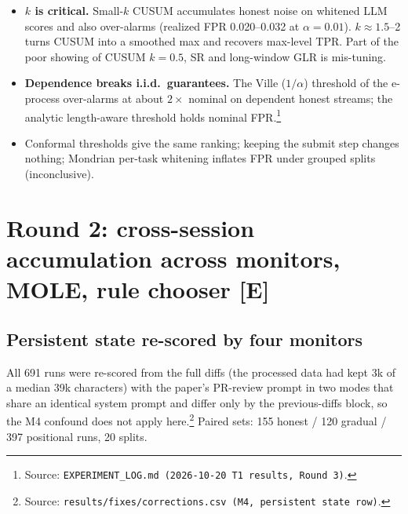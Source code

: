 \documentclass[11pt]{article}
\newcommand{\src}[1]{\footnote{Source: \nolinkurl{#1}.}}
\newcommand{\tE}{\textsf{\scriptsize\textcolor{ink2}{[E]}}\xspace}
\begin{document}
\begin{itemize}
\item \textbf{$k$ is critical.} Small-$k$ CUSUM accumulates honest noise on whitened LLM scores and also over-alarms (realized FPR 0.020--0.032 at $\alpha=0.01$). $k\approx1.5$--2 turns CUSUM into a smoothed max and recovers max-level TPR. Part of the poor showing of CUSUM $k{=}0.5$, SR and long-window GLR is mis-tuning.
\item \textbf{Dependence breaks i.i.d.\ guarantees.} The Ville ($1/\alpha$) threshold of the e-process over-alarms at about $2\times$ nominal on dependent honest streams; the analytic length-aware threshold holds nominal FPR.\src{EXPERIMENT_LOG.md (2026-10-20 T1 results, Round 3)}
\item Conformal thresholds give the same ranking; keeping the submit step changes nothing; Mondrian per-task whitening inflates FPR under grouped splits (inconclusive).
\end{itemize}

\section{Round 2: cross-session accumulation across monitors, MOLE, rule chooser \tE}

\subsection{Persistent state re-scored by four monitors}\label{sec:ps}
All 691 runs were re-scored from the full diffs (the processed data had kept 3k of a median 39k characters) with the paper's PR-review prompt in two modes that share an identical system prompt and differ only by the previous-diffs block, so the M4 confound does not apply here.\src{results/fixes/corrections.csv (M4, persistent state row)} Paired sets: 155 honest / 120 gradual / 397 positional runs, 20 splits.
\end{document}
